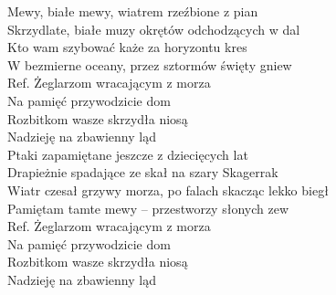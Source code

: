 
Mewy, białe mewy, wiatrem rzeźbione z pian  \tab{}\\
Skrzydlate, białe muzy okrętów odchodzących w dal \\
Kto wam szybować każe za horyzontu kres \tab{}\\
W bezmierne oceany, przez sztormów święty gniew \\
\hops
Ref. Żeglarzom wracającym z morza \tab{}\\
 Na pamięć przywodzicie dom \tab{}\\
 Rozbitkom wasze skrzydła niosą \tab{} \\
 Nadzieję na zbawienny ląd \tab{}\\
\hops
Ptaki zapamiętane jeszcze z dziecięcych lat \\
Drapieżnie spadające ze skał na szary Skagerrak \\
Wiatr czesał grzywy morza, po falach skacząc lekko biegł \\
Pamiętam tamte mewy – przestworzy słonych zew \\
\hops
Ref. Żeglarzom wracającym z morza\\
 Na pamięć przywodzicie dom \\
 Rozbitkom wasze skrzydła niosą \\
 Nadzieję na zbawienny ląd 
